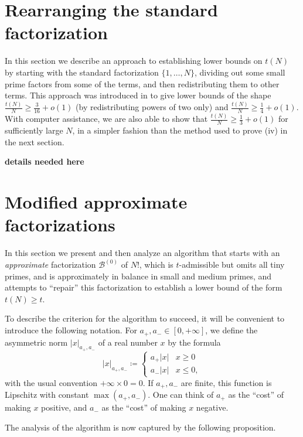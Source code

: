 \documentclass[12pt,a4paper,reqno]{amsart}
\numberwithin{equation}{section}
\theoremstyle{plain}
\theoremstyle{definition}
\newcommand\tuple{{\mathcal B}}
\begin{document}
\section{Rearranging the standard factorization}\label{rearrange-sec}

In this section we describe an approach to establishing lower bounds on $t(N)$ by starting with the standard factorization $\{1,\dots,N\}$, dividing out some small prime factors from some of the terms, and then redistributing them to other terms.  This approach was introduced in \cite{guy} to give lower bounds of the shape $\frac{t(N)}{N} \geq \frac{3}{16} + o(1)$ (by redistributing powers of two only) and $\frac{t(N)}{N} \geq \frac{1}{4} + o(1)$.  With computer assistance, we are also able to show that $\frac{t(N)}{N} \geq \frac{1}{3}+o(1)$ for sufficiently large $N$, in a simpler fashion than the method used to prove (iv) in the next section.

\textbf{details needed here}


\section{Modified approximate factorizations}\label{approx-sec}

In this section we present and then analyze an algorithm that starts with an \emph{approximate} factorization $\tuple^{(0)}$ of $N!$, which is $t$-admissible but omits all tiny primes, and is approximately in balance in small and medium primes, and attempts to ``repair'' this factorization to establish a lower bound of the form $t(N) \geq t$.  

To describe the criterion for the algorithm to succeed, it will be convenient to introduce the following notation.
For $a_+,a_- \in [0,+\infty]$, we define the asymmetric norm $|x|_{a_+,a_-}$ of a real number $x$ by the formula
$$ 
|x|_{a_+,a_-} \coloneqq  \begin{cases} 
  a_+ |x| & x\geq 0 \\
  a_- |x| & x\leq 0,
\end{cases}
$$
with the usual convention $+\infty \times 0 = 0$.
If $a_+,a_-$ are finite, this function is Lipschitz with constant $\max(a_+,a_-)$.  One can think of $a_+$ as the ``cost'' of making $x$ positive, and $a_-$ as the
``cost'' of making $x$ negative. 

The analysis of the algorithm is now captured by the following proposition.
\end{document}
